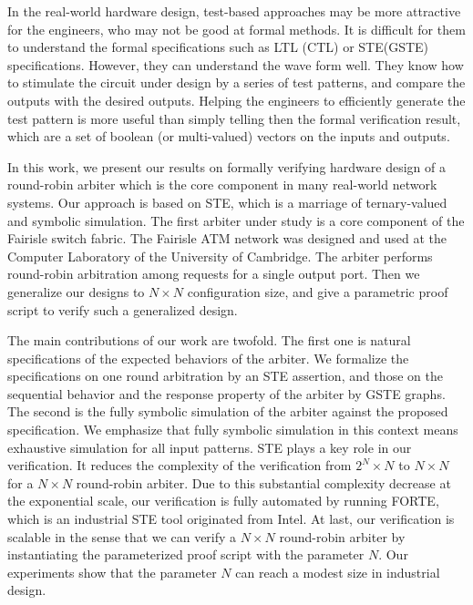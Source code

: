 \documentclass[final]{IEEEtran}
\begin{document}
In the real-world hardware design, test-based approaches may be more
attractive for the engineers, who may not be good at formal methods.
 It is difficult for them to understand the formal specifications
 such as LTL (CTL) or STE(GSTE) specifications. However, they can
 understand the wave form well. They know how to stimulate the
 circuit under design by a series of test patterns,  and compare the
  outputs with the desired outputs. Helping the engineers to
  efficiently generate the test pattern is more useful than simply telling then the formal verification result,
  which are a set of boolean
  (or multi-valued) vectors on the inputs and outputs.

In this work, we present our results on formally verifying hardware
design of a round-robin arbiter which is the core component in many
real-world network systems. Our approach is based on STE, which is a
marriage of ternary-valued and
symbolic simulation. The first arbiter under study  is a core component of the Fairisle %
switch fabric. %
The Fairisle ATM network was designed and used at the Computer
Laboratory of the University of Cambridge. The arbiter performs
round-robin arbitration among requests for a single output port.
Then we generalize our designs to $N \times N$ configuration size,
and give a parametric proof  script to verify such a generalized
design. %



The main contributions of our work are twofold. The first one is
natural specifications of the expected behaviors of the arbiter. We
formalize the specifications on   one round arbitration by an STE
assertion, and those on the sequential behavior  and the response
property of the arbiter by GSTE graphs. The second is the fully
symbolic simulation of the arbiter against the proposed
specification. We emphasize that   fully symbolic simulation in this
context means   exhaustive simulation for all   input patterns. STE
plays a key role in our verification. It reduces the complexity of
the verification from $2^{N}\times N$ to $N\times N$ for a $N\times
N$ round-robin arbiter. Due to this substantial complexity decrease
at the exponential scale, our verification is fully automated by
running FORTE, which is an industrial STE tool originated from
Intel. At last, our verification is scalable in the sense that we
can verify a $N \times N$ round-robin arbiter by instantiating the
parameterized proof script
with the parameter $N$. %
Our experiments show that the parameter $N$ can reach a modest size
in   industrial design.
\end{document}

